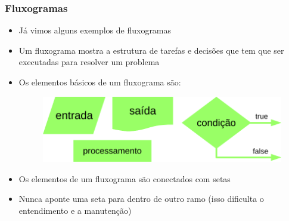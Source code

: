 \documentclass[xcolor={dvipsnames,table},aspectratio=169]{beamer}
\begin{document}
\begin{frame}\frametitle{Fluxogramas}
\begin{itemize}
	\item Já vimos alguns exemplos de fluxogramas
	\item Um fluxograma mostra a estrutura de tarefas e decisões que tem que ser executadas para resolver um problema
	\item Os elementos básicos de um fluxograma são:
\begin{figure}[h]
	\includegraphics[height=0.25\paperheight,center]{pucrs-ep-fprog-unidade_03-decisoes-laminas-elementos_de_fluxogramas.png}
\end{figure}
	\item Os elementos de um fluxograma são conectados com setas
	\item Nunca aponte uma seta para dentro de outro ramo (isso dificulta o entendimento e a manutenção)
\end{itemize}
\end{frame}
	
\end{document}
